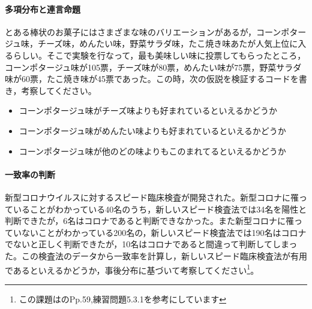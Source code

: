 \documentclass{ltjsbook}
\begin{document}
\paragraph{多項分布と連言命題}とある棒状のお菓子にはさまざまな味のバリエーションがあるが，コーンポタージュ味，チーズ味，めんたい味，野菜サラダ味，たこ焼き味あたが人気上位に入るらしい。そこで実験を行なって，最も美味しい味に投票してもらったところ，コーンポタージュ味が105票，チーズ味が80票，めんたい味が75票，野菜サラダ味が60票，たこ焼き味が45票であった。この時，次の仮説を検証するコードを書き，考察してください。
\begin{itemize}
    \item コーンポタージュ味がチーズ味よりも好まれているといえるかどうか
    \item コーンポタージュ味がめんたい味よりも好まれているといえるかどうか
    \item コーンポタージュ味が他のどの味よりもこのまれてるといえるかどうか
\end{itemize}
\paragraph{一致率の判断}新型コロナウイルスに対するスピード臨床検査が開発された。新型コロナに罹っていることがわかっている40名のうち，新しいスピード検査法では34名を陽性と判断できたが，6名はコロナであると判断できなかった。また新型コロナに罹っていないことがわかっている200名の，新しいスピード検査法では190名はコロナでないと正しく判断できたが，10名はコロナであると間違って判断してしまった。この検査法のデータから一致率を計算し，新しいスピード臨床検査法が有用であるといえるかどうか，事後分布に基づいて考察してください\footnote{この課題は\citet{Lee201709}のPp.59,練習問題5.3.1を参考にしています}。
\end{document}
